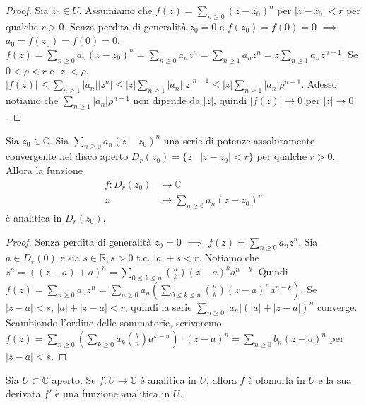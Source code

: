 \begin{proof}
  Sia $z_0 \in U$. Assumiamo che $\displaystyle f(z)=\sum_{n \ge 0}(z-z_0)^n$ per $|z-z_0|<r$ per qualche $r>0$. Senza perdita di generalità $z_0=0$ e $f(z_0)=f(0)=0$ $\implies$ $a_0=f(z_0)=f(0)=0$.
  $\displaystyle f(z)=\sum_{n \ge 0} a_n(z-z_0)^n=\sum_{n \ge 0} a_nz^n=\sum_{n \ge 1} a_nz^n=z\sum_{n \ge 1} a_nz^{n-1}$. Se $0<\rho<r$ e $|z|<\rho$, $\displaystyle |f(z)| \le \sum_{n \ge 1} |a_n||z^n| \le |z| \sum_{n \ge 1} |a_n||z|^{n-1} \le |z| \sum_{n \ge 1} |a_n| \rho^{n-1}$.
  Adesso notiamo che $\displaystyle \sum_{n \ge 1} |a_n| \rho^{n-1}$ non dipende da $|z|$, quindi $|f(z)| \longrightarrow 0$ per $|z| \longrightarrow 0$.
\end{proof}

\begin{prop}
  Sia $z_0 \in \mathbb{C}$. Sia $\displaystyle \sum_{n \ge 0} a_n(z-z_0)^n$ una serie di potenze assolutamente convergente nel disco aperto $D_r(z_0)=\{z \mid |z-z_0|<r\}$ per qualche $r>0$. Allora la funzione
  \begin{align*}
    f:D_r(z_0) &\longrightarrow \mathbb{C}\\
    z &\longmapsto \sum_{n \ge 0} a_n(z-z_0)^n
  \end{align*}
  è analitica in $D_r(z_0)$.
\end{prop}

\begin{proof}
  Senza perdita di generalità $z_0=0$ $\implies$ $\displaystyle f(z)=\sum_{n \ge 0} a_nz^n$. Sia $a \in D_r(0)$ e sia $s \in \mathbb{R}, s>0$ t.c. $|a|+s<r$. Notiamo che $\displaystyle z^n=((z-a)+a)^n=\displaystyle \sum_{0 \le k \le n} \binom{n}{k}(z-a)^ka^{n-k}$.
  Quindi $\displaystyle f(z)=\sum_{n \ge 0} a_nz^n=\sum_{n \ge 0} a_n\left(\sum_{0 \le k \le n} \binom{n}{k}(z-a)^na^{n-k}\right)$. Se $|z-a|<s$, $|a|+|z-a|<r$, quindi la serie $\displaystyle \sum_{n \ge 0} |a_n|(|a|+|z-a|)^n$ converge.
  Scambiando l'ordine delle sommatorie, scriveremo $\displaystyle f(z)=\sum_{n \ge 0} \left(\sum_{k \ge 0} a_k\binom{k}{n}a^{k-n}\right)\cdot (z-a)^n=\sum_{n \ge 0}b_n(z-a)^n$ per $|z-a|<s$.
\end{proof}

\begin{thm}
  Sia $U \subset \mathbb{C}$ aperto. Se $f:U \longrightarrow \mathbb{C}$ è analitica in $U$, allora $f$ è olomorfa in $U$ e la sua derivata $f'$ è una funzione analitica in $U$.
\end{thm}

